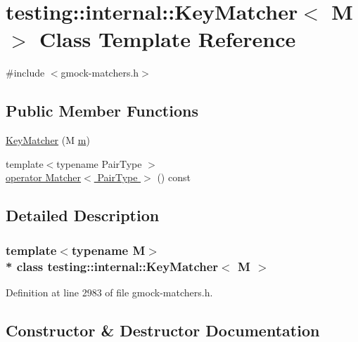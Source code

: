 \hypertarget{classtesting_1_1internal_1_1_key_matcher}{}\section{testing\+:\+:internal\+:\+:Key\+Matcher$<$ M $>$ Class Template Reference}
\label{classtesting_1_1internal_1_1_key_matcher}


{\ttfamily \#include $<$gmock-\/matchers.\+h$>$}

\subsection*{Public Member Functions}
\begin{DoxyCompactItemize}
\item 
\hyperlink{classtesting_1_1internal_1_1_key_matcher_a08429692150bf9304b493192abcf16d4}{Key\+Matcher} (M \hyperlink{variables__e_8js_aab4247b6acebcba996939b177f483c14}{m})
\item 
{\footnotesize template$<$typename Pair\+Type $>$ }\\\hyperlink{classtesting_1_1internal_1_1_key_matcher_ae8380c09682da0b2d50f167b298246d0}{operator Matcher$<$ Pair\+Type $>$} () const 
\end{DoxyCompactItemize}


\subsection{Detailed Description}
\subsubsection*{template$<$typename M$>$\\*
class testing\+::internal\+::\+Key\+Matcher$<$ M $>$}



Definition at line 2983 of file gmock-\/matchers.\+h.



\subsection{Constructor \& Destructor Documentation}

